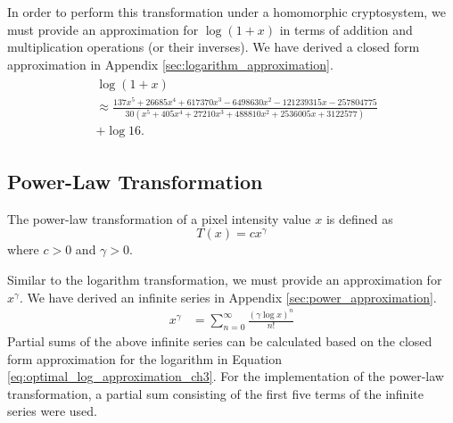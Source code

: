 In order to perform this transformation under a homomorphic cryptosystem, we must provide an approximation for $\log\left(1 + x\right)$ in terms of addition and multiplication operations (or their inverses). We have derived a closed form approximation in Appendix \ref{sec:logarithm_approximation}.
\begin{align}\label{eq:optimal_log_approximation_ch3}
	\begin{split}
		&\log\left(1+x\right) \\
		&\approx \frac{137x^5 + 26685x^4 + 617370x^3 - 6498630x^2 - 121239315x - 257804775}
		{30(x^5 + 405x^4 + 27210x^3 + 488810x^2 + 2536005x + 3122577)}\\
		&+ \log{16}.
	\end{split}
\end{align}

\subsection{Power-Law Transformation}
The power-law transformation of a pixel intensity value $x$ is defined as
\begin{equation}
    T\left(x\right) = cx^{\gamma}
\end{equation}
where $c>0$ and $\gamma > 0$.

Similar to the logarithm transformation, we must provide an approximation for $x^\gamma$.
We have derived an infinite series in Appendix \ref{sec:power_approximation}.
\begin{align*}
	x^\gamma &= \sum_{n=0}^{\infty}{\frac{(\gamma\log{x})^n}{n!}}
\end{align*}
Partial sums of the above infinite series can be calculated based on the closed form approximation for the logarithm in Equation \ref{eq:optimal_log_approximation_ch3}. For the implementation of the power-law transformation, a partial sum consisting of the first five terms of the infinite series were used.

